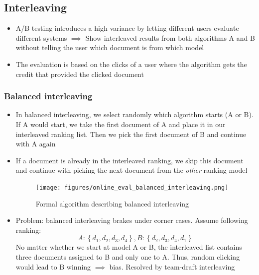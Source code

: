\subsection{Interleaving}
\begin{itemize}
	\item A/B testing introduces a high variance by letting different users evaluate different systems $\implies$ Show interleaved results from both algorithms A and B without telling the user which document is from which model
	\item The evaluation is based on the clicks of a user where the algorithm gets the credit that provided the clicked document
\end{itemize}
\subsubsection{Balanced interleaving}
\begin{itemize}
	\item In balanced interleaving, we select randomly which algorithm starts (A or B). If A would start, we take the first document of A and place it in our interleaved ranking list. Then we pick the first document of B and continue with A again
	\item If a document is already in the interleaved ranking, we skip this document and continue with picking the next document from the \textit{other} ranking model 
	\begin{figure}[ht]
		\centering
		\texttt{[image: figures/online\_eval\_balanced\_interleaving.png]}
		\caption{Formal algorithm describing balanced interleaving}
		\label{img:online_eval_balanced_interleaving}
	\end{figure}
	\item Problem: balanced interleaving brakes under corner cases. Assume following ranking:
	$$A: \left\{d_1, d_2, d_3, d_4\right\}, B: \left\{d_2, d_3, d_4, d_1\right\}$$
	No matter whether we start at model A or B, the interleaved list contains three documents assigned to B and only one to A. Thus, random clicking would lead to B winning $\implies$ bias. Resolved by team-draft interleaving
\end{itemize}
